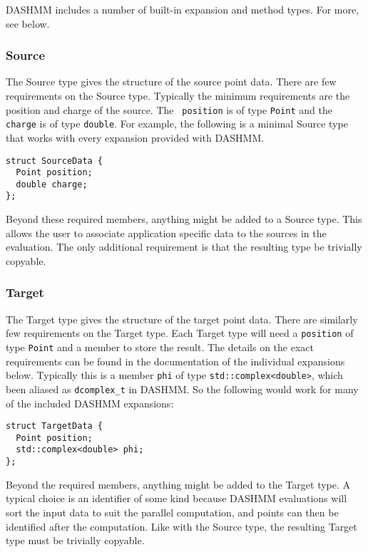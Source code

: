 \documentclass[11pt]{book}
\begin{document}
DASHMM includes a number of built-in expansion and method types. For
more, see below. 


\subsubsection{Source} 
The Source type gives the structure of the source point data. There
are few requirements on the Source type. Typically the minimum
requirements are the position and charge of the source. The {\tt
  position} is of type {\tt Point} and the {\tt charge} is of type
{\tt double}. For example, the following is a minimal Source type that
works with every expansion provided with DASHMM. 

\begin{verbatim} 
struct SourceData {
  Point position; 
  double charge; 
}; 
\end{verbatim} 

Beyond these required members, anything might be added to a Source
type. This allows the user to associate application specific data to
the sources in the evaluation. The only additional requirement is that
the resulting type be trivially copyable. 

\subsubsection{Target} 
The Target type gives the structure of the target point data. There
are similarly few requirements on the Target type. Each Target type
will need a {\tt position} of type {\tt Point} and a member to store
the result. The details on the exact requirements can be found in the
documentation of the individual expansions below. Typically this is a
member {\tt phi} of type {\tt std::complex<double>}, which been
  aliased as {\tt dcomplex\_t} in DASHMM. So the following would work
  for many of the included DASHMM expansions: 


\begin{verbatim} 
struct TargetData {
  Point position; 
  std::complex<double> phi;
}; 
\end{verbatim} 

Beyond the required members, anything might be added to the Target
type. A typical choice is an identifier of some kind because DASHMM
evaluations will sort the input data to suit the parallel computation,
and points can then be identified after the computation. Like with the
Source type, the resulting Target type must be trivially copyable. 
\end{document}
